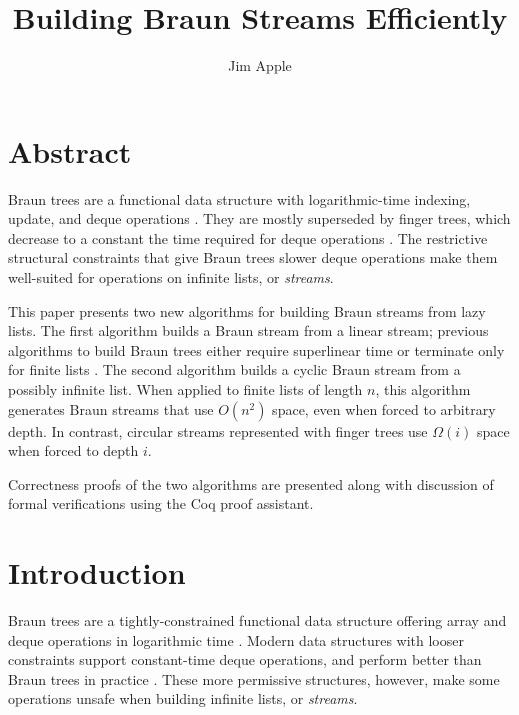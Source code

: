 \documentclass[envcountsect]{llncs}
\begin{document}
\title{Building Braun Streams Efficiently}

\author{Jim Apple}

\institute{}

\maketitle

\section*{Abstract}

Braun trees are a functional data structure with logarithmic-time indexing, update, and deque operations \cite{hoogerwoord}.
They are mostly superseded by finger trees, which decrease to a constant the time required for deque operations \cite{kaplan96purely,HinzePat}.
The restrictive structural constraints that give Braun trees slower deque operations make them well-suited for operations on infinite lists, or {\em streams}.

This paper presents two new algorithms for building Braun streams from lazy lists.
The first algorithm builds a Braun stream from a linear stream; previous algorithms to build Braun trees either require superlinear time or terminate only for finite lists \cite{okasakiBraun}.
The second algorithm builds a cyclic Braun stream from a possibly infinite list. 
When applied to finite lists of length $n$, this algorithm generates Braun streams that use $O(n^2)$ space, even when forced to arbitrary depth.
In contrast, circular streams represented with finger trees use $\Omega(i)$ space when forced to depth $i$.

Correctness proofs of the two algorithms are presented along with discussion of formal verifications using the Coq proof assistant.

\section{Introduction}
\label{logspaceCycle}

Braun trees are a tightly-constrained functional data structure offering array and deque operations in logarithmic time \cite{hoogerwoord,okasakiBraun}.
Modern data structures with looser constraints support constant-time deque operations, and perform better than Braun trees in practice \cite{HinzePat,okasakiSkewLists}.
These more permissive structures, however, make some operations unsafe when building infinite lists, or {\em streams}.
\end{document}
